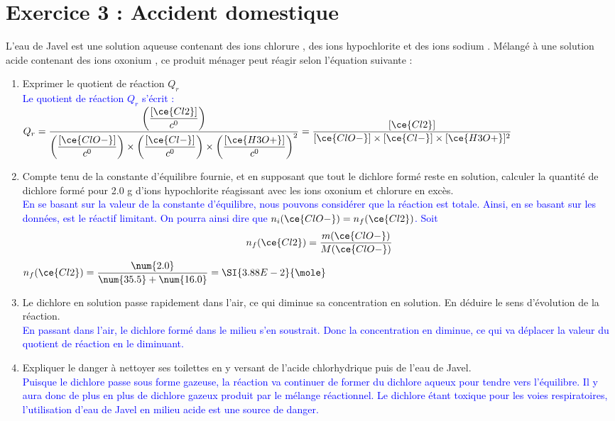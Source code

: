 \documentclass[a4paper,11pt,fleqn]{article}%
\begin{document}
\section*{Exercice 3 : Accident domestique}
L'eau de Javel est une solution aqueuse contenant des ions chlorure , des ions hypochlorite  et des ions sodium . Mélangé à une solution acide contenant des ions oxonium , ce produit ménager peut réagir selon l'équation suivante :\\
\begin{enumerate}
	\item Exprimer le quotient de réaction $Q_r$\\
	\textcolor{blue}{Le quotient de réaction $Q_r$ s'écrit :\\
	$Q_r = \dfrac{\left(\dfrac{[\ce{Cl2}]}{c^0}\right)}{\left(\dfrac{[\ce{ClO-}]}{c^0}\right) \times \left(\dfrac{[\ce{Cl-}]}{c^0}\right)\times \left(\dfrac{[\ce{H3O+}]}{c^0}\right)^2} =\dfrac{[\ce{Cl2}] }{[\ce{ClO-}] \times [\ce{Cl-}]\times [\ce{H3O+}]^2}$
	}
	\item Compte tenu de la constante d'équilibre fournie, et en supposant que tout le dichlore  formé reste en solution, calculer la quantité de dichlore formé  pour \num{2,0} \unit{\gram} d'ions hypochlorite  réagissant avec les ions oxonium  et chlorure  en excès.\\
	\textcolor{blue}{En se basant sur la valeur de la constante d'équilibre, nous pouvons considérer que la réaction est totale. Ainsi, en se basant sur les données,  est le réactif limitant. On pourra ainsi dire que $n_i(\ce{ClO-}) = n_f(\ce{Cl2})$. Soit $$n_f(\ce{Cl2}) = \dfrac{m(\ce{ClO-})}{M(\ce{ClO-})}$$  $n_f(\ce{Cl2}) = \dfrac{\num{2.0}}{\num{35.5}+\num{16.0}}=\SI{3.88E-2}{\mole}$}
	\item Le dichlore  en solution passe rapidement dans l'air, ce qui diminue sa concentration en solution. En déduire le sens d'évolution de la réaction.\\
	\textcolor{blue}{En passant dans l'air, le dichlore formé dans le milieu s'en soustrait. Donc la concentration en  diminue, ce qui va déplacer la valeur du quotient de réaction en le diminuant.}
	\item Expliquer le danger à nettoyer ses toilettes en y versant de l'acide chlorhydrique puis de l'eau de Javel.\\
	\textcolor{blue}{Puisque le dichlore passe sous forme gazeuse, la réaction va continuer de former du dichlore aqueux pour tendre vers l'équilibre. Il y aura donc de plus en plus de dichlore gazeux produit par le mélange réactionnel. Le dichlore étant toxique pour les voies respiratoires, l'utilisation d'eau de Javel en milieu acide est une source de danger.}
\end{enumerate}
\end{document}
